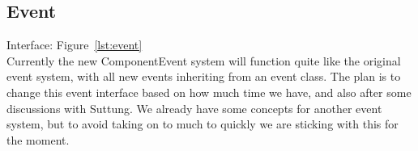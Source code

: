 \subsection{Event}
Interface: Figure~\ref{lst:event}\\\noindent
Currently the new ComponentEvent system will function quite like the original event system, 
with all new events inheriting from an event class. 
The plan is to change this event interface based on how much time we have, 
and also after some discussions with Suttung. 
We already have some concepts for another event system, but to avoid taking on to much to quickly we are sticking with this for the moment.
